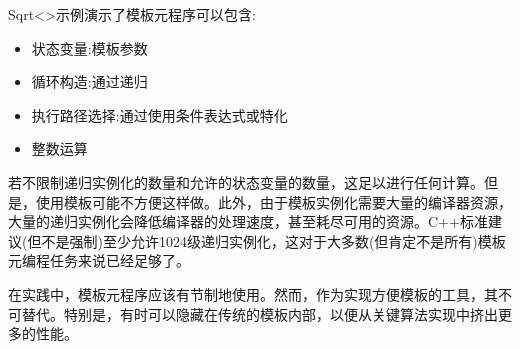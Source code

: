 Sqrt<>示例演示了模板元程序可以包含:

\begin{itemize}
\item 
状态变量:模板参数

\item 
循环构造:通过递归

\item 
执行路径选择:通过使用条件表达式或特化

\item 
整数运算
\end{itemize}

若不限制递归实例化的数量和允许的状态变量的数量，这足以进行任何计算。但是，使用模板可能不方便这样做。此外，由于模板实例化需要大量的编译器资源，大量的递归实例化会降低编译器的处理速度，甚至耗尽可用的资源。C++标准建议(但不是强制)至少允许1024级递归实例化，这对于大多数(但肯定不是所有)模板元编程任务来说已经足够了。

在实践中，模板元程序应该有节制地使用。然而，作为实现方便模板的工具，其不可替代。特别是，有时可以隐藏在传统的模板内部，以便从关键算法实现中挤出更多的性能。














































